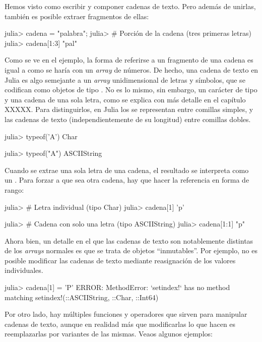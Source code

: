 Hemos visto como escribir y componer cadenas de texto. Pero además de unirlas, también es posible extraer fragmentos de ellas:

\begin{jlconcode}
julia> cadena = "palabra";
julia> # Porción de la cadena (tres primeras letras)
julia> cadena[1:3]
"pal"
\end{jlconcode}

Como se ve en el ejemplo, la forma de referirse a un fragmento de una cadena es igual a como se haría con un \emph{array} de números. De hecho, una cadena de texto en Julia es algo semejante a un \emph{array} unidimensional de letras y símbolos, que se codifican como objetos de tipo . No es lo mismo, sin embargo, un carácter de tipo  y una cadena de una sola letra, como se explica con más detalle en el capítulo XXXXX. Para distinguirlos, en Julia los  se representan entre comillas simples, y las cadenas de texto (independientemente de su longitud) entre comillas dobles.

\begin{jlconcode}
julia> typeof('A')
Char

julia> typeof("A")
ASCIIString
\end{jlconcode}

Cuando se extrae una sola letra de una cadena, el resultado se interpreta como un . Para forzar a que sea otra cadena, hay que hacer la referencia en forma de rango:

\begin{jlconcode}
julia> # Letra individual (tipo Char)
julia> cadena[1]
'p'

julia> # Cadena con solo una letra (tipo ASCIIString)
julia> cadena[1:1]
"p"
\end{jlconcode}

Ahora bien, un detalle en el que las cadenas de texto son notablemente distintas de los \emph{arrays} normales es que se trata de objetos ``inmutables''. Por ejemplo, no es posible modificar las cadenas de texto mediante reasignación de los valores individuales.

\begin{jlconcode}
julia> cadena[1] = 'P'
ERROR: MethodError: `setindex!` has no method matching setindex!(::ASCIIString,
::Char, ::Int64)
\end{jlconcode}

Por otro lado, hay múltiples funciones y operadores que sirven para manipular cadenas de texto, aunque en realidad más que modificarlas lo que hacen es reemplazarlas por variantes de las mismas. Veaos algunos ejemplos:

